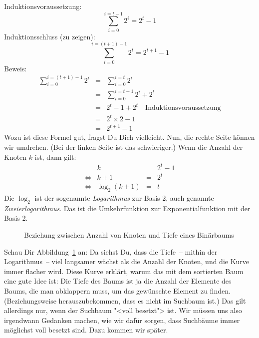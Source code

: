 \smallskip

\noindent Induktionsvoraussetzung:
\begin{displaymath}
  \sum_{i=0}^{i=t-1} 2^i  = 2^t-1
\end{displaymath}
%
Induktionsschluss (zu zeigen):
%
\begin{displaymath}
    \sum_{i=0}^{i=(t+1)-1} 2^t = 2^{t+1} - 1
\end{displaymath}
%
Beweis:
%
\begin{eqnarray*}
  \sum_{i=0}^{i=(t+1)-1} 2^i
  &=& \sum_{i=0}^{i=t} 2^i\\
  &=& \sum_{i=0}^{i=t-1} 2^i + 2^t\\
  &=& 2^t-1 + 2^t \quad\textrm{Induktionsvoraussetzung}\\
  &=& 2^t\times 2 - 1\\
  &=& 2^{t+1} - 1
\end{eqnarray*}
%
Wozu ist diese Formel gut, fragst Du Dich vielleicht.  Nun, die rechte
Seite können wir umdrehen.  (Bei der linken Seite ist das
schwieriger.) Wenn die Anzahl der Knoten $k$ ist, dann gilt:
%
\begin{displaymath}
  \begin{array}{lrcl}
    & k &=& 2^t - 1\\
    \Longleftrightarrow & k + 1 &=& 2^t\\
    \Longleftrightarrow & \log_2(k+1) &=& t
  \end{array}
\end{displaymath}
%
Die $\log_2$ ist der sogenannte
\textit{Logarithmus} zur Basis 2, auch genannte
\textit{Zweierlogarithmus}.  Das ist die
Umkehrfunktion zur Exponentialfunktion mit der Basis 2.

\begin{figure}[tb]
  \centering
{}
  \caption{Beziehung zwischen Anzahl von Knoten und Tiefe eines Binärbaums}
  \label{fig:log2}
\end{figure}

Schau Dir Abbildung~\ref{fig:log2} an: Da siehst Du, dass die Tiefe~--
mithin der Logarithmus~-- viel langsamer wächst als die Anzahl der
Knoten, und die Kurve immer flacher wird.  Diese Kurve erklärt, warum
das mit dem sortierten Baum eine gute Idee ist: Die Tiefe des Baums ist ja
die Anzahl der Elemente des Baums, die man abklappern muss, um das
gewünschte Element zu finden.  (Beziehungsweise herauszubekommen, dass
es nicht im Suchbaum ist.)  Das gilt allerdings nur, wenn der Suchbaum
"<voll besetzt"> ist.  Wir müssen uns also irgendwann Gedanken machen,
wie wir dafür sorgen, dass Suchbäume immer möglichst voll besetzt
sind.  Dazu kommen wir später.

